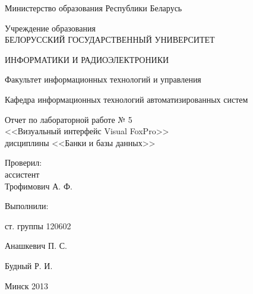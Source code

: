 \thispagestyle{empty}

\begin{center}
Министерство образования Республики Беларусь\par
\vspace{2mm}
Учреждение образования \\
БЕЛОРУССКИЙ ГОСУДАРСТВЕННЫЙ УНИВЕРСИТЕТ\par
ИНФОРМАТИКИ И РАДИОЭЛЕКТРОНИКИ\par 
\vspace{2mm}
Факультет информационных технологий и управления\par
\vspace{2mm}
Кафедра информационных технологий автоматизированных систем\par

\end{center}

\vspace{50mm}

\begin{center}
  Отчет по лабораторной работе № 5\\
  <<Визуальный интерфейс Visual FoxPro>> \\
  дисциплины <<Банки и базы данных>>
\end{center}

\vspace{40mm}

\begin{multicols}{2}
\begin{flushleft}
  Проверил: \\
  ассистент \\
  Трофимович А. Ф.
\end{flushleft}

\begin{flushright}
  Выполнили:

  ст. группы 120602

  Анашкевич П. С.

  Будный Р. И.

\end{flushright}
\end{multicols}

\vspace{40mm}
\begin{center}
Минск 2013
\end{center}

\newpage

